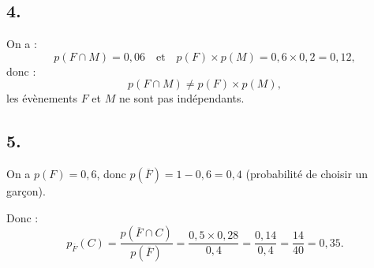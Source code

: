 \documentclass[10pt]{article}
\begin{document}
\subsection*{4.}

On a :
\[
p(F \cap M) = 0{,}06 \quad \text{et} \quad p(F) \times p(M) = 0{,}6 \times 0{,}2 = 0{,}12,
\]
donc :
\[
p(F \cap M) \neq p(F) \times p(M),
\]
les évènements \(F\) et \(M\) ne sont pas indépendants.

\subsection*{5.}

On a \( p(F) = 0{,}6 \), donc \( p(\overline{F}) = 1 - 0{,}6 = 0{,}4 \) (probabilité de choisir un garçon).

Donc :
\[
p_{\overline{F}}(C) = \dfrac{p(\overline{F} \cap C)}{p(\overline{F})} = \dfrac{0{,}5 \times 0{,}28}{0{,}4} = \dfrac{0{,}14}{0{,}4} = \dfrac{14}{40} = 0{,}35.
\]
\end{document}

